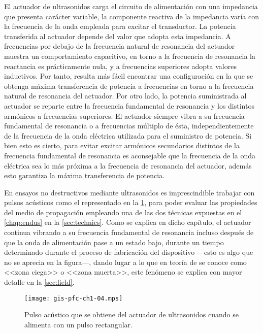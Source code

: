 El actuador de ultrasonidos carga el circuito de alimentación con una
impedancia que presenta carácter variable, la componente reactiva de la
impedancia varía con la frecuencia de la onda empleada para excitar el
transductor. La potencia transferida al actuador depende del valor que
adopta esta impedancia. A frecuencias por debajo de la frecuencia natural
de resonancia del actuador muestra un comportamiento capacitivo, en torno a
la frecuencia de resonancia la reactancia es prácticamente nula, y a
frecuencias superiores adopta valores inductivos. Por tanto, resulta más
fácil encontrar una configuración en la que se obtenga máxima transferencia
de potencia a frecuencias en torno a la frecuencia natural de resonancia
del actuador. Por otro lado, la potencia suministrada al actuador se
reparte entre la frecuencia fundamental de resonancia y los distintos
armónicos a frecuencias superiores. El actuador siempre vibra a su
frecuencia fundamental de resonancia o a frecuencias múltiplo de ésta,
independientemente de la frecuencia de la onda eléctrica utilizada para el
suministro de potencia. Si bien esto es cierto, para evitar excitar
armónicos secundarios distintos de la frecuencia fundamental de resonancia
es aconsejable que la frecuencia de la onda eléctrica sea lo más próxima a
la frecuencia de resonancia del actuador, además esto garantiza la máxima
transferencia de potencia.

En ensayos no destructivos mediante ultrasonidos es imprescindible trabajar
con pulsos acústicos como el representado en la \cref{fig:pulse}, para
poder evaluar las propiedades del medio de propagación empleando una de las
dos técnicas expuestas en el \cref{chap:endus} en la \cref{sec:technics}.
Como se explica en dicho capítulo, el actuador continua vibrando a su
frecuencia fundamental de resonancia incluso después de que la onda de
alimentación pase a un estado bajo, durante un tiempo determinado durante
el proceso de fabricación del dispositivo ---esto es algo que no se aprecia
en la figura---, dando lugar a lo que en teoría de  se conoce
como <<zona ciega>> o <<zona muerta>>, este fenómeno se explica con mayor
detalle en la \cref{sec:field}.

\begin{figure}
	\begin{center}
		\texttt{[image: gis-pfc-ch1-04.mps]}
	\end{center}
	\caption[Pulso acústico generado por el actuador de
	ultrasonidos]{Pulso acústico que se obtiene del actuador de
	ultrasonidos cuando se alimenta con un pulso rectangular.}
	\label{fig:pulse}
\end{figure}

